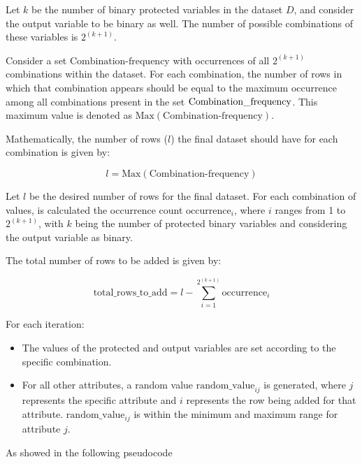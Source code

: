 Let \( k \) be the number of binary protected variables in the dataset \( D \), and consider the output variable to be binary as well. The number of possible combinations of these variables is \( 2^{(k+1)} \).

Consider a set \( \text{Combination-frequency} \) with occurrences of all \( 2^{(k+1)} \) combinations within the dataset. For each combination, the number of rows in which that combination appears should be equal to the maximum occurrence among all combinations present in the set \( \text{Combination\textunderscore frequency} \). This maximum value is denoted as \( \text{Max}(\text{Combination-frequency}) \).

Mathematically, the number of rows (\( l \)) the final dataset should have for each combination is given by:

\[
l = \text{Max}(\text{Combination-frequency})
\]



Let \( l \) be the desired number of rows for the final dataset. For each combination of values, is calculated the occurrence count \( \text{occurrence}_i \), where \( i \) ranges from 1 to \( 2^{(k+1)} \), with \( k \) being the number of protected binary variables and considering the output variable as binary.

The total number of rows to be added is given by:

\[
\text{total\_rows\_to\_add} = l - \sum_{i=1}^{2^{(k+1)}} \text{occurrence}_i
\]

For each iteration:

\begin{itemize}

    \item The values of the protected and output variables are set according to the specific combination.
    
    \item For all other attributes, a random value \( \text{random\_value}_{ij} \) is generated, where \( j \) represents the specific attribute and \( i \) represents the row being added for that attribute. \( \text{random\_value}_{ij} \) is within the minimum and maximum range for attribute \( j \).

\end{itemize}

As showed in the following pseudocode

